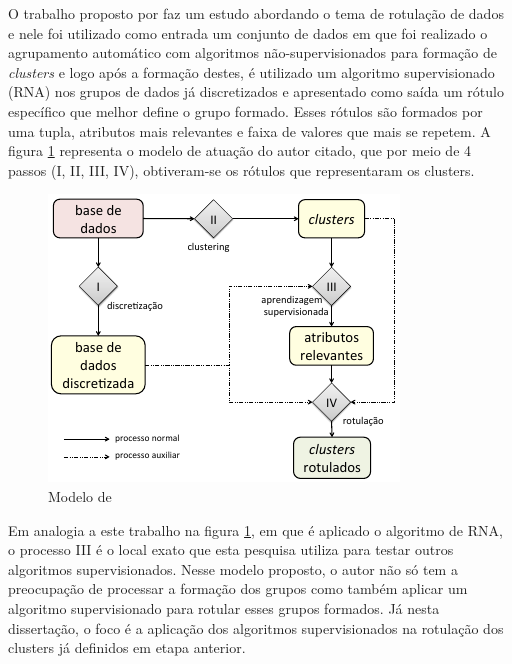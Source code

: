 O trabalho proposto por \cite{Lopes2016} faz um estudo abordando o tema de rotulação de dados e nele foi utilizado como entrada um conjunto de dados em que foi realizado o agrupamento automático com algoritmos não-supervisionados para formação de \textit{clusters} e logo após a formação destes, é utilizado um algoritmo supervisionado (RNA) nos grupos de dados já discretizados e apresentado como saída um rótulo específico que melhor define o grupo formado. Esses rótulos são formados por uma tupla, atributos mais relevantes e faixa de valores que mais se repetem. A figura \ref{fig:modeloLOPES} representa o modelo de atuação do autor citado, que por meio de 4 passos (I, II, III, IV),  obtiveram-se os rótulos que representaram os clusters. 
\begin{figure}[h]
        \centering
        \includegraphics[scale=1]{figs/modeloLopes.png}
        \caption{Modelo de \cite{Lopes2016}} 
        \label{fig:modeloLOPES}
\end{figure}

Em analogia a este trabalho na figura \ref{fig:modeloLOPES}, em que é aplicado o algoritmo de RNA, o processo III é o local exato que esta pesquisa utiliza para testar outros algoritmos supervisionados. Nesse modelo proposto, o autor não só tem a preocupação de processar a formação dos grupos como também aplicar um algoritmo supervisionado para rotular esses grupos formados. Já nesta dissertação, o foco é a aplicação dos algoritmos supervisionados na rotulação dos clusters já definidos em etapa anterior. 



